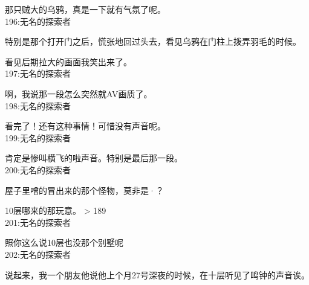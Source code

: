 那只贼大的乌鸦，真是一下就有气氛了呢。\\

196:无名的探索者

特别是那个打开门之后，慌张地回过头去，看见乌鸦在门柱上拨弄羽毛的时候。

看见后期拉大的画面我笑出来了。\\

197:无名的探索者

啊，我说那一段怎么突然就AV画质了。\\

198:无名的探索者

看完了！还有这种事情！可惜没有声音呢。\\

199:无名的探索者

肯定是惨叫横飞的啦声音。特别是最后那一段。\\

200:无名的探索者

屋子里噌的冒出来的那个怪物，莫非是·？

10层哪来的那玩意。 > 189\\

201:无名的探索者

照你这么说10层也没那个别墅呢\\

202:无名的探索者

说起来，我一个朋友他说他上个月27号深夜的时候，在十层听见了鸣钟的声音诶。

